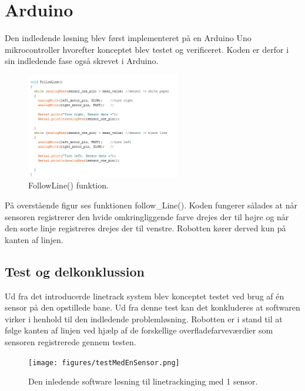 \section{Arduino}
Den indledende løsning blev først implementeret på en Arduino Uno mikrocontroller hvorefter konceptet blev testet og verificeret. Koden er derfor i sin indledende fase også skrevet i Arduino.

\begin{figure}[h!]
  \centering
  \includegraphics[width=0.6\textwidth]{figures/followLine2.png}
  \caption{FollowLine() funktion.}
  \label{follow_line_kode}
\end{figure}

På overstående figur ses funktionen follow\_Line(). Koden fungerer sålades at når sensoren registrerer den hvide omkringliggende farve drejes der til højre og når den sorte linje registreres drejes der til venstre. Robotten kører derved kun på kanten af linjen. 

\subsection{Test og delkonklussion}
Ud fra det introducerde linetrack system blev konceptet testet ved brug af én sensor på den opstillede bane. 
\newline
Ud fra denne test kan det konkluderes at softwaren virker i henhold til den indledende problemløsning. Robotten er i stand til at følge kanten af linjen ved hjælp af de forskellige overfladefarveværdier som sensoren registrerede gennem testen. 
\newline

\begin{figure}[h!]
  \centering
  \texttt{[image: figures/testMedEnSensor.png]}
  \caption{Den inledende software løsning til linetrackinging med 1 sensor.}
  \label{init_software}
\end{figure}


